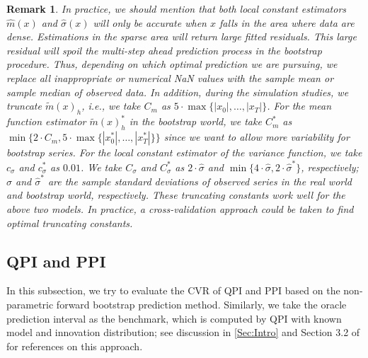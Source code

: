 \documentclass[a4paper]{article}
\newtheorem{Remark}{Remark}[section]
\begin{document}
\begin{Remark}
In practice, we should mention that both local constant estimators $\widehat{m}(x)$ and $\widehat{\sigma}(x)$ will only be accurate when $x$ falls in the area where data are dense. Estimations in the sparse area will return large fitted residuals. This large residual will spoil the multi-step ahead prediction process in the bootstrap procedure. %
Thus, depending on which optimal prediction we are pursuing, we replace all inappropriate or numerical NaN values with the sample mean or sample median of observed data. In addition, during the simulation studies, we truncate $\widetilde{m}(x)_{h}$, i.e., we take $C_m$ as $5\cdot \max\{|x_0|,\ldots,|x_T|\}$. For the mean function estimator $\widetilde{m}(x)_{h}^*$ in the bootstrap world, we take $C^*_m$ as $\min\{2\cdot C_m, 5\cdot\max\{|x^*_0|,\ldots,|x^*_T|\}\}$ since we want to allow more variability for bootstrap series. For the local constant estimator of the variance function, we take $c_{\sigma}$ and $c^*_{\sigma}$ as $0.01$. We take $C_{\sigma}$ and $C^*_{\sigma}$ as $2\cdot \hat{\sigma}$ and $\min\{4\cdot \hat{\sigma},2\cdot \hat{\sigma}^*\}$, respectively; $\hat{\sigma}$ and $\hat{\sigma}^*$ are the sample standard deviations of observed series in the real world and bootstrap world, respectively. These truncating constants work well for the above two models. In practice, a cross-validation approach could be taken to find optimal truncating constants. 
\end{Remark}
\subsection{QPI and PPI}
In this subsection, we try to evaluate the CVR of QPI and PPI based on the non-parametric forward bootstrap prediction method. Similarly, we take the oracle prediction interval as the benchmark, which is computed by QPI with known model and innovation distribution; see discussion in \cref{Sec:Intro} and Section 3.2 of \cite{wu2023bootstrap} for references on this approach. 
\end{document}
